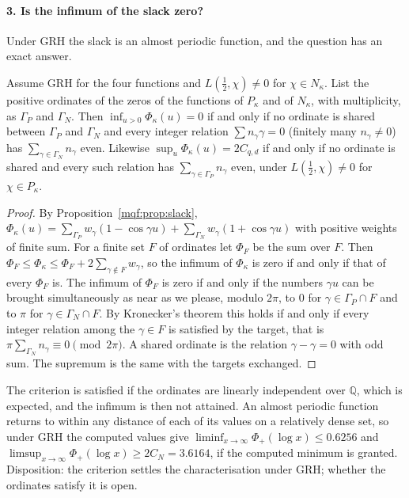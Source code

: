 \paragraph{3. Is the infimum of the slack zero?} Under GRH the slack is an almost periodic function, and the question has an exact answer.

\begin{proposition}\label{mqf:prop:kronecker}
Assume GRH for the four functions and $L(\frac12,\chi)\ne0$ for $\chi\in N_\kappa$. List the positive ordinates of the zeros of the functions of $P_\kappa$ and of $N_\kappa$, with multiplicity, as $\Gamma_P$ and $\Gamma_N$. Then $\inf_{u>0}\Phi_\kappa(u)=0$ if and only if no ordinate is shared between $\Gamma_P$ and $\Gamma_N$ and every integer relation $\sum n_\gamma\gamma=0$ (finitely many $n_\gamma\ne0$) has $\sum_{\gamma\in\Gamma_N}n_\gamma$ even. Likewise $\sup_u\Phi_\kappa(u)=2C_{q,d}$ if and only if no ordinate is shared and every such relation has $\sum_{\gamma\in\Gamma_P}n_\gamma$ even, under $L(\frac12,\chi)\ne0$ for $\chi\in P_\kappa$.
\end{proposition}

\begin{proof}
By Proposition~\ref{mqf:prop:slack}, $\Phi_\kappa(u)=\sum_{\Gamma_P}w_\gamma(1-\cos\gamma u)+\sum_{\Gamma_N}w_\gamma(1+\cos\gamma u)$ with positive weights of finite sum. For a finite set $F$ of ordinates let $\Phi_F$ be the sum over $F$. Then $\Phi_F\le\Phi_\kappa\le\Phi_F+2\sum_{\gamma\notin F}w_\gamma$, so the infimum of $\Phi_\kappa$ is zero if and only if that of every $\Phi_F$ is. The infimum of $\Phi_F$ is zero if and only if the numbers $\gamma u$ can be brought simultaneously as near as we please, modulo $2\pi$, to $0$ for $\gamma\in\Gamma_P\cap F$ and to $\pi$ for $\gamma\in\Gamma_N\cap F$. By Kronecker's theorem this holds if and only if every integer relation among the $\gamma\in F$ is satisfied by the target, that is $\pi\sum_{\Gamma_N}n_\gamma\equiv0\pmod{2\pi}$. A shared ordinate is the relation $\gamma-\gamma=0$ with odd sum. The supremum is the same with the targets exchanged.
\end{proof}

The criterion is satisfied if the ordinates are linearly independent over $\mathbb Q$, which is expected, and the infimum is then not attained. An almost periodic function returns to within any distance of each of its values on a relatively dense set, so under GRH the computed values give $\liminf_{x\to\infty}\Phi_+(\log x)\le0.6256$ and $\limsup_{x\to\infty}\Phi_+(\log x)\ge2C_N=3.6164$, if the computed minimum is granted. Disposition: the criterion settles the characterisation under GRH; whether the ordinates satisfy it is open.


